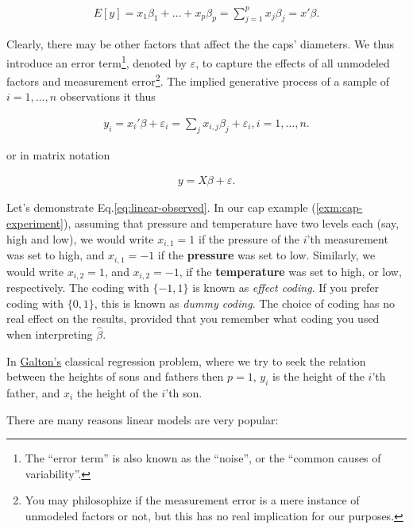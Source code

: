 \documentclass[]{book}
\theoremstyle{definition}
\theoremstyle{definition}
\theoremstyle{definition}
\theoremstyle{remark}
\let\BeginKnitrBlock\begin \let\EndKnitrBlock\end
\begin{document}
\begin{align}
  E[y]=x_1 \beta_1 + \dots + x_p \beta_p = \sum_{j=1}^p x_j \beta_j = x'\beta .
  \label{eq:linear-mean}
\end{align}

Clearly, there may be other factors that affect the the caps' diameters.
We thus introduce an error term\footnote{The ``error term'' is also
  known as the ``noise'', or the ``common causes of variability''.},
denoted by \(\varepsilon\), to capture the effects of all unmodeled
factors and measurement error\footnote{You may philosophize if the
  measurement error is a mere instance of unmodeled factors or not, but
  this has no real implication for our purposes.}. The implied
generative process of a sample of \(i=1,\dots,n\) observations it thus

\begin{align}
  y_i = x_i'\beta + \varepsilon_i = \sum_j x_{i,j} \beta_j + \varepsilon_i , i=1,\dots,n .
  \label{eq:linear-observed}
\end{align}

or in matrix notation

\begin{align}
  y = X \beta + \varepsilon .
  \label{eq:linear-matrix}
\end{align}

Let's demonstrate Eq.\eqref{eq:linear-observed}. In our cap example
(\ref{exm:cap-experiment}), assuming that pressure and temperature have
two levels each (say, high and low), we would write \(x_{i,1}=1\) if the
pressure of the \(i\)'th measurement was set to high, and \(x_{i,1}=-1\)
if the \textbf{pressure} was set to low. Similarly, we would write
\(x_{i,2}=1\), and \(x_{i,2}=-1\), if the \textbf{temperature} was set
to high, or low, respectively. The coding with \(\{-1,1\}\) is known as
\emph{effect coding}. If you prefer coding with \(\{0,1\}\), this is
known as \emph{dummy coding}. The choice of coding has no real effect on
the results, provided that you remember what coding you used when
interpreting \(\hat \beta\).

\BeginKnitrBlock{remark}
{}In
\href{https://en.wikipedia.org/wiki/Regression_toward_the_mean}{Galton's}
classical regression problem, where we try to seek the relation between
the heights of sons and fathers then \(p=1\), \(y_i\) is the height of
the \(i\)'th father, and \(x_i\) the height of the \(i\)'th son.
\EndKnitrBlock{remark}

There are many reasons linear models are very popular:
\end{document}
